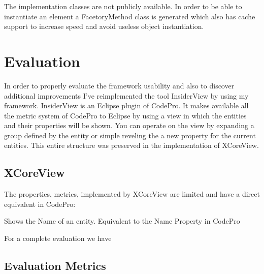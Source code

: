 	The implementation classes are not publicly available.
In order to be able to instantiate an element a FacetoryMethod class is
generated which also has cache support to increase speed and avoid useless
object instantiation.
	
\section {Evaluation}
		In order to properly evaluate the framework usability and also to discover 
additional improvements I've reimplemented the tool InsiderView by using my
framework. InsiderView is an Eclipse plugin of CodePro. It makes available all
the metric system of CodePro to Eclipse by using a view in which the entities
and their properties will be shown. You can operate on the view by expanding a group
defined by the entity or simple reveling the a new property for the current
entities.
		This entire structure was preserved in the implementation of XCoreView.

\subsection {XCoreView}

		The properties, metrics, implemented by XCoreView are limited and have a
direct equivalent in CodePro:
		\begin{description}[labelindent=2cm]
		  \item[Name]  Shows the Name of an entity.  Equivalent to the Name
Property in CodePro
		  \item[Method Metrics]
		  		\begin{description}
		  			\item[]
		  		\end{description}
		  \item[Class Metrics]
		  		\begin{description}
		  			\item[]
		  		\end{description}
		  \item[Groups]
		  		\begin{description}
		  			\item[]
		  		\end{description}
		\end{description}
		
		For a complete evaluation we have

\subsection {Evaluation Metrics}



	